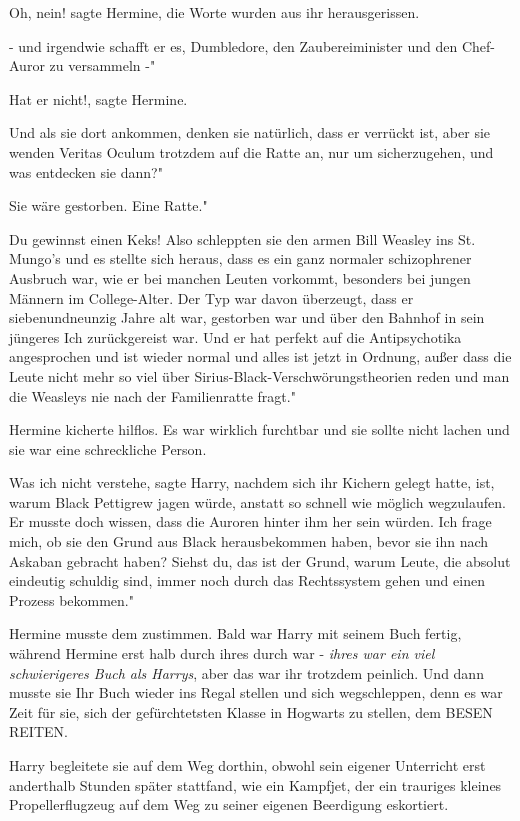 \glqq{}Oh, nein!\grqq{} sagte Hermine, die Worte wurden aus ihr herausgerissen.

\glqq{}- und irgendwie schafft er es, Dumbledore, den Zaubereiminister und den
Chef-Auror zu versammeln -"

\glqq{}Hat er nicht!\grqq{}, sagte Hermine.

\glqq{}Und als sie dort ankommen, denken sie natürlich, dass er verrückt ist,
aber sie wenden Veritas Oculum trotzdem auf die Ratte an, nur um sicherzugehen,
und was entdecken sie dann?"

Sie wäre gestorben. \glqq{}Eine Ratte."

\glqq{}Du gewinnst einen Keks! Also schleppten sie den armen Bill Weasley ins St.
Mungo's und es stellte sich heraus, dass es ein ganz normaler schizophrener
Ausbruch war, wie er bei manchen Leuten vorkommt, besonders bei jungen Männern
im College-Alter. Der Typ war davon überzeugt, dass er siebenundneunzig Jahre
alt war, gestorben war und über den Bahnhof in sein jüngeres Ich zurückgereist
war. Und er hat perfekt auf die Antipsychotika angesprochen und ist wieder
normal und alles ist jetzt in Ordnung, außer dass die Leute nicht mehr so viel
über Sirius-Black-Verschwörungstheorien reden und man die Weasleys nie nach der
Familienratte fragt."

Hermine kicherte hilflos. Es war wirklich furchtbar und sie sollte nicht lachen
und sie war eine schreckliche Person.

\glqq{}Was ich nicht verstehe\grqq{}, sagte Harry, nachdem sich ihr Kichern
gelegt hatte, \glqq{}ist, warum Black Pettigrew jagen würde, anstatt so schnell
wie möglich wegzulaufen. Er musste doch wissen, dass die Auroren hinter ihm her
sein würden. Ich frage mich, ob sie den Grund aus Black herausbekommen haben,
bevor sie ihn nach Askaban gebracht haben? Siehst du, das ist der Grund, warum
Leute, die absolut eindeutig schuldig sind, immer noch durch das Rechtssystem
gehen und einen Prozess bekommen."

Hermine musste dem zustimmen. Bald war Harry mit seinem Buch fertig, während
Hermine erst halb durch ihres durch war - \emph{ihres war ein viel schwierigeres
Buch als Harrys}, aber das war ihr trotzdem peinlich. Und dann musste sie Ihr
Buch wieder ins Regal stellen und sich wegschleppen, denn es war Zeit für sie,
sich der gefürchtetsten Klasse in Hogwarts zu stellen, dem BESEN REITEN.

Harry begleitete sie auf dem Weg dorthin, obwohl sein eigener Unterricht erst
anderthalb Stunden später stattfand, wie ein Kampfjet, der ein trauriges kleines
Propellerflugzeug auf dem Weg zu seiner eigenen Beerdigung eskortiert.

